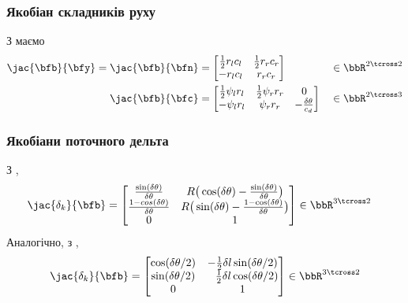 \subsubsection{Якобіан складників руху}
%
З 
 маємо
%
\begin{subequations}
\label{equ:diff_drive_psis_jac}
\begin{align}
\jac{\bfb}{\bfy} = \jac{\bfb}{\bfn} &= \begin{bmatrix}
\frac12 r_l c_l & \frac12 r_r c_r  \\
- r_l c_l       & r_r c_r
\end{bmatrix}
&&\in \bbR^{2\tcross2}
\\
\jac{\bfb}{\bfc} &= \begin{bmatrix}
\frac12 \psi_{l} r_l & \frac12 \psi_{r} r_r & 0\\
-\psi_{l} r_l        & \psi_{r} r_r & -\frac{\delta\theta}{c_d}
\end{bmatrix}
&&\in \bbR^{2\tcross3}
\end{align}
\end{subequations}



\subsubsection{Якобіани поточного дельта}

З 
,
%
\begin{align}\label{equ:diff_drive_exact_inte_jac}
\jac{\delta_k}{\bfb} &= 
\begin{bmatrix}
\frac{\sin(\delta\theta)}{\delta\theta} 
&
R\big(\cos(\delta\theta)-\frac{\sin(\delta\theta)}{\delta\theta}\big)\\
\frac{1-cos(\delta\theta)}{\delta\theta} 
&
R\big(\sin(\delta\theta)-\frac{1-\cos(\delta\theta)}{\delta\theta}\big)\\
0 & 1
\end{bmatrix}
\in \bbR^{3\tcross2}
\end{align}
%
Аналогічно, з 
,
%
\begin{align}\label{equ:diff_drive_runge_kutta_meas_jac}
\jac{\delta_k}{\bfb} =
\begin{bmatrix}
\cos(\delta\theta/2) &-\frac12\delta l\sin(\delta\theta/2)\\
\sin(\delta\theta/2) &\phantom{-}\frac12\delta l\cos(\delta\theta/2)\\
0 & 1
\end{bmatrix}
\in \bbR^{3\tcross2}
\end{align}
%
